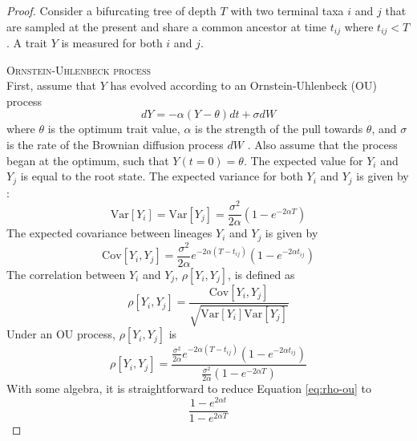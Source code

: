 \documentclass[12pt,twoside]{article}
\newcommand{\Var}{\mathrm{Var}}
\newcommand{\Cov}{\mathrm{Cov}}
\begin{document}
\begin{proof}

Consider a bifurcating tree of depth $T$ with two terminal taxa $i$ and $j$ that are sampled at the present and share a common ancestor at time $t_{ij}$ where $t_{ij} < T$. A trait $Y$ is measured for both $i$ and $j$.\bigskip

\par{\textsc{Ornstein-Uhlenbeck process}}\\
First, assume that $Y$ has evolved according to an Ornstein-Uhlenbeck (OU) process 
\begin{equation}
dY = -\alpha(Y - \theta)dt + \sigma dW
\end{equation}
where $\theta$ is the optimum trait value, $\alpha$ is the strength of the pull towards $\theta$, and $\sigma$ is the rate of the Brownian diffusion process $dW$ \citep{Hansen1997}. Also assume that the process began at the optimum, such that $Y(t=0) = \theta$. The expected value for $Y_i$ and $Y_j$ is equal to the root state. The expected variance for both $Y_i$ and $Y_j$ is given by \citet{Hansen1997}:
\begin{equation}\label{eq:var-ou}
\Var[Y_i] = \Var[Y_j] = \frac{\sigma^2}{2\alpha}(1-e^{-2\alpha T})
\end{equation}
The expected covariance between lineages $Y_i$ and $Y_j$ is given by
\begin{equation}
\Cov[Y_i, Y_j] = \frac{\sigma^2}{2\alpha}e^{-2 \alpha (T-t_{ij})}(1-e^{-2\alpha t_{ij}}) 
\end{equation}
The correlation between $Y_i$ and $Y_j$, $\rho[Y_i, Y_j]$, is defined as
\[\rho[Y_i, Y_j] = \frac{\Cov[Y_i, Y_j]}{\sqrt{\Var[Y_i]\Var[Y_j]}}\]
Under an OU process, $\rho[Y_i, Y_j]$ is
\begin{equation}\label{eq:rho-ou}
\rho[Y_i, Y_j] = \frac{\frac{\sigma^2}{2\alpha}e^{-2 \alpha (T-t_{ij})}(1-e^{-2\alpha t_{ij}})}{\frac{\sigma^2}{2\alpha}(1-e^{-2\alpha T})}
\end{equation}
With some algebra, it is straightforward to reduce Equation \ref{eq:rho-ou} to
\begin{equation}
\frac{1-e^{2\alpha t}}
{1-e^{2\alpha T}}
\end{equation}\bigskip


\end{proof}
\end{document}
